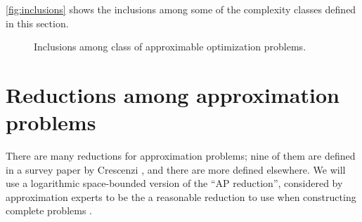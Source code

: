 \documentclass[]{article}
\theoremstyle{plain}
\theoremstyle{definition}
\begin{document}
\autoref{fig:inclusions} shows the inclusions among some of the complexity classes defined in this section.
\begin{figure}
  \caption{Inclusions among class of approximable optimization problems.\label{fig:inclusions}}
\end{figure}

\section{Reductions among approximation problems}

There are many reductions for approximation problems; nine of them are defined in a survey paper by Crescenzi \cite{crescenzi97}, and there are more defined elsewhere.
We will use a logarithmic space-bounded version of the ``AP reduction'', considered by approximation experts to be the a reasonable reduction to use when constructing complete problems \cite[Section~2]{crescenzi97} \cite[Section~8.6]{acgkmp99}.
\end{document}
